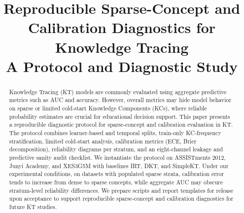 \documentclass[conference]{IEEEtran}
\begin{document}
\title{Reproducible Sparse-Concept and Calibration Diagnostics for Knowledge Tracing\\
{\large A Protocol and Diagnostic Study}}

\author{
}

\maketitle

\begin{abstract}
Knowledge Tracing (KT) models are commonly evaluated using aggregate predictive metrics such as AUC and accuracy. However, overall metrics may hide model behavior on sparse or limited cold‑start Knowledge Components (KCs), where reliable probability estimates are crucial for educational decision support. This paper presents a reproducible diagnostic protocol for sparse‑concept and calibration evaluation in KT. The protocol combines learner‑based and temporal splits, train‑only KC‑frequency stratification, limited cold‑start analysis, calibration metrics (ECE, Brier decomposition), reliability diagrams per stratum, and an eight‑channel leakage and predictive sanity audit checklist. We instantiate the protocol on ASSISTments 2012, Junyi Academy, and XES3G5M with baselines IRT, DKT, and SimpleKT. Under our experimental conditions, on datasets with populated sparse strata, calibration error tends to increase from dense to sparse concepts, while aggregate AUC may obscure stratum-level reliability differences. We prepare scripts and report templates for release upon acceptance to support reproducible sparse‑concept and calibration diagnostics for future KT studies.
\end{abstract}
\end{document}

